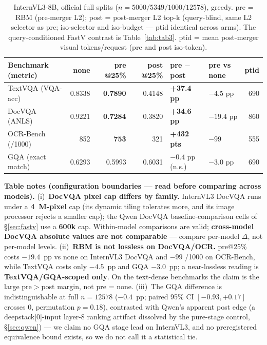 \documentclass[sigconf,review,anonymous]{acmart}
\begin{document}
\begin{table}[t]
  \centering
  \small
  \caption{InternVL3-8B, official full splits ($n = 5000 / 5349 / 1000 /
    12578$), greedy. pre = RBM (pre-merger L2); post = post-merger L2 top-k
    (query-blind, same L2 selector as pre; iso-selector and iso-budget --- ptid
    identical across arms). The query-conditioned FastV contrast is
    Table~\ref{tab:tab3}. ptid = mean post-merger visual tokens/request (pre and
    post iso-token).}
  \label{tab:tab2}
  \begin{tabular}{@{}l r r r l l r@{}}
    \toprule
    Benchmark (metric) & none & pre @25\% & post @25\% & pre $-$ post & pre vs none & ptid \\
    \midrule
    TextVQA (VQA-acc) & 0.8338 & \textbf{0.7890} & 0.4148 & \textbf{+37.4 pp} & $-4.5$ pp  & 690 \\
    DocVQA (ANLS)     & 0.9221 & \textbf{0.7284} & 0.3820 & \textbf{+34.6 pp} & $-19.4$ pp & 860 \\
    OCR-Bench (/1000) & 852    & \textbf{753}    & 321    & \textbf{+432 pts} & $-99$      & 555 \\
    GQA (exact match) & 0.6293 & 0.5993          & 0.6031 & $-0.4$ pp (n.s.)   & $-3.0$ pp  & 690 \\
    \bottomrule
  \end{tabular}

  \vspace{3pt}
  \footnotesize
  \textbf{Table notes (configuration boundaries --- read before comparing across
  models).} (i)~\textbf{DocVQA pixel cap differs by family.} InternVL3 DocVQA
  runs under a \textbf{4~M-pixel} cap (its dynamic tiling tolerates more, and its
  image processor rejects a smaller cap); the Qwen DocVQA baseline-comparison
  cells of \S\ref{sec:fastv} use a \textbf{600k} cap. Within-model comparisons
  are valid; \textbf{cross-model DocVQA absolute values are not comparable} ---
  compare per-model $\Delta$, not per-model levels. (ii)~\textbf{RBM is not
  lossless on DocVQA/OCR.} pre@25\% costs $-19.4$~pp vs none on InternVL3 DocVQA
  and $-99$ /1000 on OCR-Bench, while TextVQA costs only $-4.5$~pp and GQA
  $-3.0$~pp; a near-lossless reading is \textbf{TextVQA/GQA-scoped only}. On the
  text-dense benchmarks the claim is the large pre$>$post margin, not pre =
  none. (iii)~The GQA difference is indistinguishable at full $n = 12578$
  ($-0.4$~pp; paired 95\% CI $[-0.93, +0.17]$ crosses 0, permutation $p =
  0.18$), contrasted with Qwen's apparent post edge (a deepstack[0]-input
  layer-8 ranking artifact dissolved by the pure-stage control,
  \S\ref{sec:qwen}) --- we claim no
  GQA stage lead on InternVL3, and no preregistered equivalence bound exists,
  so we do not call it a statistical tie.
\end{table}
\end{document}
